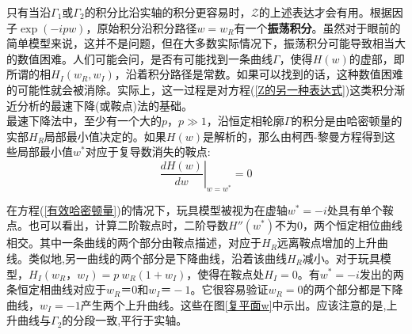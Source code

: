 只有当沿$\Gamma_1$或$\Gamma_2$的积分比沿实轴的积分更容易时，$\mathcal{Z}$的上述表达才会有用。根据因子$\exp(-ipw)$，原始积分沿积分路径$w=w_R$有一个\textbf{振荡积分}。虽然对于眼前的简单模型来说，这并不是问题，但在大多数实际情况下，振荡积分可能导致相当大的数值困难。人们可能会问，是否有可能找到一条曲线$\Gamma$，使得$H(w)$的虚部，即所谓的相$H_I(w_R,w_I)$，沿着积分路径是常数。如果可以找到的话，这种数值困难的可能性就会被消除。实际上，这一过程是对方程(\ref{Z的另一种表达式})这类积分渐近分析的最速下降(或鞍点)法的基础。\\

最速下降法中，至少有一个大的$p$，$p\gg1$，沿恒定相轮廓$\Gamma$的积分是由哈密顿量的实部$H_R$局部最小值决定的。如果$H(w)$是解析的，那么由柯西-黎曼方程得到这些局部最小值$w^*$对应于复导数消失的鞍点:\\
\begin{equation}
\left. \frac{dH(w)}{dw}\right|_{w=w^*} = 0 \label{复导数为0}
\end{equation}


在方程(\ref{有效哈密顿量})的情况下，玩具模型被视为在虚轴$w^* = -i$处具有单个鞍点。也可以看出，计算二阶鞍点时，二阶导数$H''(w^*)$不为0，两个恒定相位曲线相交。其中一条曲线的两个部分由鞍点描述，对应于$H_R$远离鞍点增加的上升曲线。类似地,另一曲线的两个部分是下降曲线，沿着该曲线$H_R$减小。对于玩具模型，$H_I(w_R，w_I) = p \ w_R(1+w_I)$，使得在鞍点处$H_I = 0$。有$w^* = -i$发出的两条恒定相曲线对应于$w_R＝0$和$w_I＝-1$。它很容易验证$w_R=0$的两个部分都是下降曲线，$w_I=-1$产生两个上升曲线。这些在图\ref{复平面w}中示出。应该注意的是,上升曲线与$\Gamma_2$的分段一致,平行于实轴。\\

